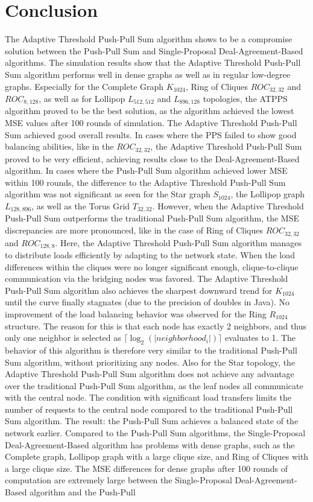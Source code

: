 \chapter{Conclusion}\label{chap:conclusion}
The Adaptive Threshold Push-Pull Sum algorithm shows to be a compromise solution between the Push-Pull Sum and Single-Proposal Deal-Agreement-Based algorithms. The simulation results show that the Adaptive Threshold Push-Pull Sum algorithm performs well in dense graphs as well as in regular low-degree graphs. Especially for the Complete Graph $K_{1024}$, Ring of Cliques $ROC_{32,32}$ and $ROC_{8,128}$, as well as for Lollipop $L_{512,512}$ and $L_{896,128}$ topologies, the ATPPS algorithm proved to be the best solution, as the algorithm achieved the lowest MSE values after 100 rounds of simulation. The Adaptive Threshold Push-Pull Sum achieved good overall results. In cases where the PPS failed to show good balancing abilities, like in the $ROC_{32,32}$, the Adaptive Threshold Push-Pull Sum proved to be very efficient, achieving results close to the Deal-Agreement-Based algorithm. In cases where the Push-Pull Sum algorithm achieved lower MSE within 100 rounds, the difference to the Adaptive Threshold Push-Pull Sum algorithm was not significant as seen for the Star graph $S_{1024}$, the Lollipop graph $L_{128,896}$, as well as the Torus Grid $T_{32,32}$. However, when the Adaptive Threshold Push-Pull Sum outperforms the traditional Push-Pull Sum algorithm, the MSE discrepancies are more pronounced, like in the case of Ring of Cliques $ROC_{32,32}$ and $ROC_{128,8}$. Here, the Adaptive Threshold Push-Pull Sum algorithm manages to distribute loads efficiently by adapting to the network state. When the load differences within the cliques were no longer significant enough, clique-to-clique communication via the bridging nodes was favored. The Adaptive Threshold Push-Pull Sum algorithm also achieves the sharpest downward trend for $K_{1024}$ until the curve finally stagnates (due to the precision of doubles in Java). No improvement of the load balancing behavior was observed for the Ring $R_{1024}$ structure. The reason for this is that each node has exactly 2 neighbors, and thus only one neighbor is selected as $\lceil\log_{2}{(|neighborhood_{i}|)}\rceil$ evaluates to 1. The behavior of this algorithm is therefore very similar to the traditional Push-Pull Sum algorithm, without prioritizing any nodes. Also for the Star topology, the Adaptive Threshold Push-Pull Sum algorithm does not achieve any advantage over the traditional Push-Pull Sum algorithm, as the leaf nodes all communicate with the central node. The condition with significant load transfers limits the number of requests to the central node compared to the traditional Push-Pull Sum algorithm. The result: the Push-Pull Sum achieves a balanced state of the network earlier. Compared to the Push-Pull Sum algorithms, the Single-Proposal Deal-Agreement-Based algorithm has problems with dense graphs, such as the Complete graph, Lollipop graph with a large clique size, and Ring of Cliques with a large clique size. The MSE differences for dense graphs after 100 rounds of computation are extremely large between the Single-Proposal Deal-Agreement-Based algorithm and the Push-Pull 